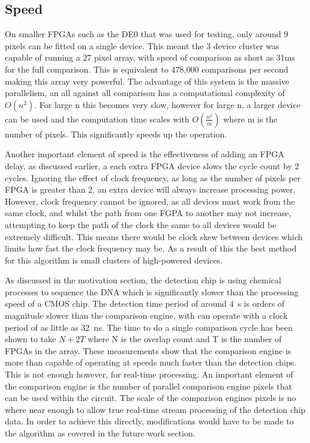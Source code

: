 \subsection{Speed}


On smaller FPGAs such as the DE0 that was used for testing, only around 9 pixels can be fitted on a single device. This meant the 3 device cluster was capable of running a 27 pixel array, with speed of comparison as short as 31ms for the full comparison. This is equivalent to 478,000 comparisons per second making this array very powerful. The advantage of this system is the massive parallelism, an all against all comparison has a computational complexity of $O(n^2)$. For large n this becomes very slow, however for large n, a larger device can be used and the computation time scales with $O(\frac{n^2}{m})$ where m is the number of pixels. This significantly speeds up the operation. 


Another important element of speed is the effectiveness of adding an FPGA delay, as discussed earlier, a each extra FPGA device slows the cycle count by 2 cycles. Ignoring the effect of clock frequency, as long as the number of pixels per FPGA is greater than 2, an extra device will always increase processing power. However, clock frequency cannot be ignored, as all devices must work from the same clock, and whilst the path from one FGPA to another may not increase, attempting to keep the path of the clock the same to all devices would be extremely difficult. This means there would be clock skew between devices which limits how fast the clock frequency may be. As a result of this the best method for this algorithm is small clusters of high-powered devices. 


As discussed in the motivation section, the detection chip is using chemical processes to sequence the DNA which is significantly slower than the processing speed of a CMOS chip. The detection time period of around 4~s is orders of magnitude slower than the comparison engine, with can operate with a clock period of as little as 32~ns. The time to do a single comparison cycle has been shown to take $N + 2T $ where N is the overlap count and T is the number of FPGAs in the array. These measurements show that the comparison engine is more than capable of operating at speeds much faster than the detection chips. This is not enough however, for real-time processing. An important element of the comparison engine is the number of parallel comparison engine pixels that can be used within the circuit. The scale of the comparison engines pixels is no where near enough to allow true real-time stream processing of the detection chip data. In order to achieve this directly, modifications would have to be made to the algorithm as covered in the future work section.

